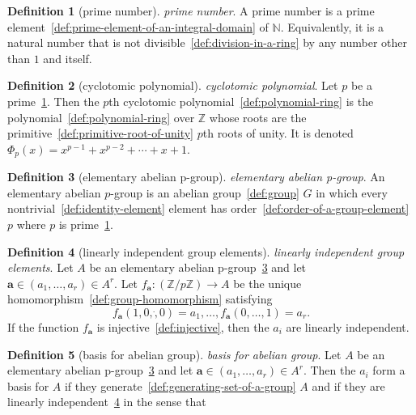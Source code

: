 \documentclass[12pt,a4paper]{article}
\theoremstyle{definition}
\newtheorem{definition}{Definition}
\begin{document}
\begin{definition}[prime number]\label{def:prime-number}
\emph{prime number}. A prime number is a prime element~\ref{def:prime-element-of-an-integral-domain} of $\mathbb N$. Equivalently, it is a natural number that is not divisible~\ref{def:division-in-a-ring} by any number other than $1$ and itself.
\end{definition}

\begin{definition}[cyclotomic polynomial]\label{def:cyclotomic-polynomial}
\emph{cyclotomic polynomial}. Let $p$ be a prime~\ref{def:prime-number}. Then the $p$th cyclotomic polynomial~\ref{def:polynomial-ring} is the polynomial~\ref{def:polynomial-ring} over $\mathbb Z$ whose roots are the primitive~\ref{def:primitive-root-of-unity} $p$th roots of unity. It is denoted $\Phi_p (x) = x^{p-1} + x^{p-2} + \cdots + x + 1$.
\end{definition}

\begin{definition}[elementary abelian p-group]\label{def:elementary-abelian-p-group}
\emph{elementary abelian p-group}. An elementary abelian $p$-group is an abelian group~\ref{def:group} $G$ in which every nontrivial~\ref{def:identity-element} element has order~\ref{def:order-of-a-group-element} $p$ where $p$ is prime~\ref{def:prime-number}.
\end{definition}

\begin{definition}[linearly independent group elements]\label{def:linearly-independent-group-elements}
\emph{linearly independent group elements}. Let $A$ be an elementary abelian p-group~\ref{def:elementary-abelian-p-group} and let $\mathbf a\in(a_1,\dots,a_r)\in A^r$. Let $f_\mathbf a:(\mathbb Z/p\mathbb Z)\to A$ be the unique homomorphism~\ref{def:group-homomorphism} satisfying $$f_\mathbf a(1,0,\dot,0) = a_1, \dots, f_\mathbf a(0,\dots, 1) = a_r.$$ If the function $f_\mathbf a$ is injective~\ref{def:injective}, then the $a_i$ are linearly independent.
\end{definition}

\begin{definition}[basis for abelian group]\label{def:basis-for-abelian-group}
\emph{basis for abelian group}. Let $A$ be an elementary abelian p-group~\ref{def:elementary-abelian-p-group} and let $\mathbf a\in(a_1,\dots,a_r)\in A^r$. Then the $a_i$ form a basis for $A$ if they generate~\ref{def:generating-set-of-a-group} $A$ and if they are linearly independent~\ref{def:linearly-independent-group-elements} in the sense that
\end{definition}
\end{document}
